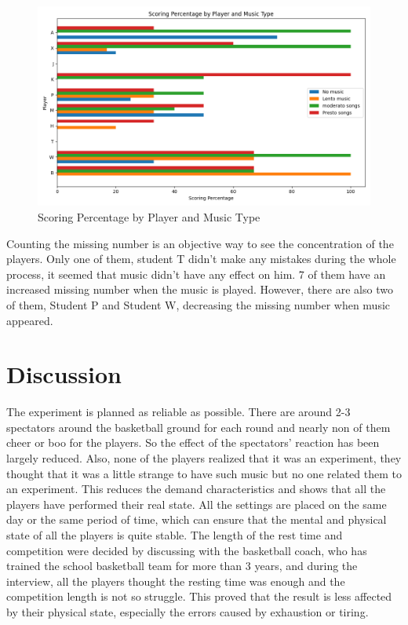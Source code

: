 \documentclass{article}
\begin{document}
\begin{figure}[h]
\centering
\includegraphics[width=\textwidth]{out.png}
\caption{Scoring Percentage by Player and Music Type}
\label{scoreperc}
\end{figure}

Counting the missing number is an objective way to see the concentration of the players. Only one of them, student T didn't make any mistakes during the whole process, it seemed that music didn't have any effect on him. 7 of them have an increased missing number when the music is played. However, there are also two of them, Student P and Student W, decreasing the missing number when music appeared. 

\section{Discussion}

The experiment is planned as reliable as possible. There are around 2-3 spectators around the basketball ground for each round and nearly non of them cheer or boo for the players. So the effect of the spectators' reaction has been largely reduced. Also, none of the players realized that it was an experiment, they thought that it was a little strange to have such music but no one related them to an experiment. This reduces the demand characteristics and shows that all the players have performed their real state. All the settings are placed on the same day or the same period of time, which can ensure that the mental and physical state of all the players is quite stable. The length of the rest time and competition were decided by discussing with the basketball coach, who has trained the school basketball team for more than 3 years, and during the interview, all the players thought the resting time was enough and the competition length is not so struggle. This proved that the result is less affected by their physical state, especially the errors caused by exhaustion or tiring. 
\end{document}
